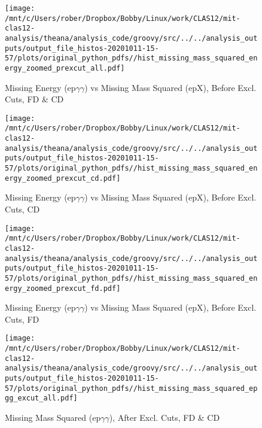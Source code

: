 \documentclass{article}
\begin{document}
\begin{landscape}
    \begin{figure}[h]
        \centering

        \texttt{[image: /mnt/c/Users/rober/Dropbox/Bobby/Linux/work/CLAS12/mit-clas12-analysis/theana/analysis\_code/groovy/src/../../analysis\_outputs/output\_file\_histos-20201011-15-57/plots/original\_python\_pdfs//hist\_missing\_mass\_squared\_energy\_zoomed\_prexcut\_all.pdf]}
        \captionsetup{textformat=empty,labelformat=blank}
        \caption{Missing Energy (ep$\gamma$$\gamma$) vs Missing Mass Squared (epX), Before Excl. Cuts, FD \& CD}
    \end{figure}
    \clearpage
    
    \begin{figure}[h]
        \centering

        \texttt{[image: /mnt/c/Users/rober/Dropbox/Bobby/Linux/work/CLAS12/mit-clas12-analysis/theana/analysis\_code/groovy/src/../../analysis\_outputs/output\_file\_histos-20201011-15-57/plots/original\_python\_pdfs//hist\_missing\_mass\_squared\_energy\_zoomed\_prexcut\_cd.pdf]}
        \captionsetup{textformat=empty,labelformat=blank}
        \caption{Missing Energy (ep$\gamma$$\gamma$) vs Missing Mass Squared (epX), Before Excl. Cuts, CD}
    \end{figure}
    \clearpage
    
    \begin{figure}[h]
        \centering

        \texttt{[image: /mnt/c/Users/rober/Dropbox/Bobby/Linux/work/CLAS12/mit-clas12-analysis/theana/analysis\_code/groovy/src/../../analysis\_outputs/output\_file\_histos-20201011-15-57/plots/original\_python\_pdfs//hist\_missing\_mass\_squared\_energy\_zoomed\_prexcut\_fd.pdf]}
        \captionsetup{textformat=empty,labelformat=blank}
        \caption{Missing Energy (ep$\gamma$$\gamma$) vs Missing Mass Squared (epX), Before Excl. Cuts, FD}
    \end{figure}
    \clearpage
    
    \begin{figure}[h]
        \centering

        \texttt{[image: /mnt/c/Users/rober/Dropbox/Bobby/Linux/work/CLAS12/mit-clas12-analysis/theana/analysis\_code/groovy/src/../../analysis\_outputs/output\_file\_histos-20201011-15-57/plots/original\_python\_pdfs//hist\_missing\_mass\_squared\_epgg\_excut\_all.pdf]}
        \captionsetup{textformat=empty,labelformat=blank}
        \caption{Missing Mass Squared (ep$\gamma$$\gamma$), After Excl. Cuts, FD \& CD}
    \end{figure}
    \clearpage
    

\end{landscape}
\end{document}

